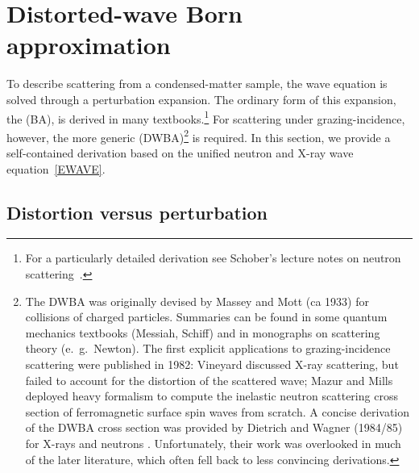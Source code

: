 \section{Distorted-wave Born approximation}\label{SDWBA}

To describe scattering from a condensed-matter sample,
%
%
%
the wave equation is solved through a perturbation expansion.
The ordinary form of this expansion, the  (BA),
%
%
is derived in many textbooks.\footnote
{For a particularly detailed derivation
see Schober's lecture notes on neutron scattering~\cite{Sch14}.}
For scattering under grazing-incidence,
%
however, the more generic
%
 (DWBA)\footnote
{The DWBA was originally devised by Massey and Mott (ca 1933)
for collisions of charged particles.
Summaries can be found in some quantum mechanics textbooks (Messiah, Schiff)
and in monographs on scattering theory (e.~g.\ Newton).
The first explicit applications to grazing-incidence scattering
were published in 1982:
Vineyard \cite{Vin82} discussed X-ray scattering,
but failed to account for the distortion of the scattered wave;
Mazur and Mills \cite{MaMi82} deployed heavy formalism
to compute the inelastic neutron scattering cross section
of ferromagnetic surface spin waves from scratch.
A concise derivation of the DWBA cross section
was provided by Dietrich and Wagner (1984/85)
for X-rays \cite{DiWa84} and neutrons \cite{DiWa85}.
Unfortunately, their work was overlooked in much of the later literature,
which often fell back to less convincing derivations.}
is required.
In this section, we provide a self-contained derivation
based on the unified neutron and X-ray wave equation~\cref{EWAVE}.

\subsection{Distortion versus perturbation}\label{Sdecompose}

